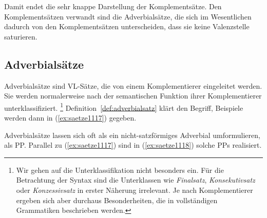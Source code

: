 Damit endet die sehr knappe Darstellung der Komplementsätze.
Den Komplementsätzen verwandt sind die Adverbialsätze, die sich im Wesentlichen dadurch von den Komplementsätzen unterscheiden, dass sie keine Valenzstelle saturieren.

\subsection{Adverbialsätze}

\label{sec:adverbialsaetze}

Adverbialsätze sind VL-Sätze, die von einem Komplementierer eingeleitet werden.
Sie werden normalerweise nach der semantischen Funktion ihrer Komplementierer unterklassifiziert.%
\footnote{Wir gehen auf die Unterklassifikation nicht besonders ein.
Für die Betrachtung der Syntax sind die Unterklassen wie \textit{Finalsatz}, \textit{Konsekutivsatz} oder \textit{Konzessivsatz} in erster Näherung irrelevant.
Je nach Komplementierer ergeben sich aber durchaus Besonderheiten, die in vollständigen Grammatiken beschrieben werden.}
Definition~\ref{def:adverbialsatz} klärt den Begriff, Beispiele werden dann in (\ref{ex:saetze1117}) gegeben.

\Stretch[0.5]


\begin{exe}
  \ex\label{ex:saetze1117}
  \begin{xlist}
  \end{xlist}
\end{exe}

Adverbialsätze lassen sich oft als ein nicht-satzförmiges Adverbial umformulieren, \zB als PP.
Parallel zu (\ref{ex:saetze1117}) sind in (\ref{ex:saetze1118}) solche PPs realisiert.

\begin{exe}
  \ex\label{ex:saetze1118}
  \begin{xlist}
  \end{xlist}
\end{exe}

